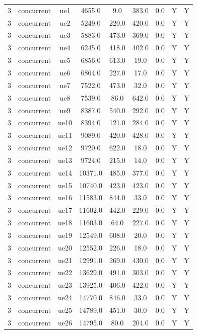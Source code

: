 \begin{table}[ht]
\begin{tabular}{|c|c|c|c|c|c|c|c|c|}
\hline
3 & concurrent & ue1 & 4655.0 & 9.0 & 383.0 & 0.0 & Y & Y \\
3 & concurrent & ue2 & 5249.0 & 220.0 & 420.0 & 0.0 & Y & Y \\
3 & concurrent & ue3 & 5883.0 & 473.0 & 369.0 & 0.0 & Y & Y \\
3 & concurrent & ue4 & 6245.0 & 418.0 & 402.0 & 0.0 & Y & Y \\
3 & concurrent & ue5 & 6856.0 & 613.0 & 19.0 & 0.0 & Y & Y \\
3 & concurrent & ue6 & 6864.0 & 227.0 & 17.0 & 0.0 & Y & Y \\
3 & concurrent & ue7 & 7522.0 & 473.0 & 32.0 & 0.0 & Y & Y \\
3 & concurrent & ue8 & 7539.0 & 86.0 & 642.0 & 0.0 & Y & Y \\
3 & concurrent & ue9 & 8387.0 & 540.0 & 292.0 & 0.0 & Y & Y \\
3 & concurrent & ue10 & 8394.0 & 121.0 & 284.0 & 0.0 & Y & Y \\
3 & concurrent & ue11 & 9089.0 & 420.0 & 428.0 & 0.0 & Y & Y \\
3 & concurrent & ue12 & 9720.0 & 622.0 & 18.0 & 0.0 & Y & Y \\
3 & concurrent & ue13 & 9724.0 & 215.0 & 14.0 & 0.0 & Y & Y \\
3 & concurrent & ue14 & 10371.0 & 485.0 & 377.0 & 0.0 & Y & Y \\
3 & concurrent & ue15 & 10740.0 & 423.0 & 423.0 & 0.0 & Y & Y \\
3 & concurrent & ue16 & 11583.0 & 844.0 & 33.0 & 0.0 & Y & Y \\
3 & concurrent & ue17 & 11602.0 & 442.0 & 229.0 & 0.0 & Y & Y \\
3 & concurrent & ue18 & 11603.0 & 64.0 & 227.0 & 0.0 & Y & Y \\
3 & concurrent & ue19 & 12549.0 & 608.0 & 20.0 & 0.0 & Y & Y \\
3 & concurrent & ue20 & 12552.0 & 226.0 & 18.0 & 0.0 & Y & Y \\
3 & concurrent & ue21 & 12991.0 & 269.0 & 430.0 & 0.0 & Y & Y \\
3 & concurrent & ue22 & 13629.0 & 491.0 & 303.0 & 0.0 & Y & Y \\
3 & concurrent & ue23 & 13925.0 & 406.0 & 422.0 & 0.0 & Y & Y \\
3 & concurrent & ue24 & 14770.0 & 846.0 & 33.0 & 0.0 & Y & Y \\
3 & concurrent & ue25 & 14789.0 & 451.0 & 30.0 & 0.0 & Y & Y \\
3 & concurrent & ue26 & 14795.0 & 80.0 & 204.0 & 0.0 & Y & Y \\

\end{tabular}
\end{table}
